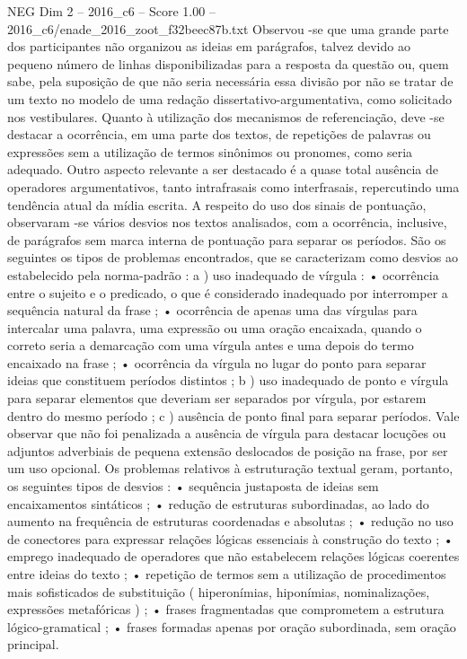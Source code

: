 \begin{textsample}{NEG Dim 2 – 2016\_c6 – Score 1.00 – 2016\_c6/enade\_2016\_zoot\_f32beec87b.txt}
Observou -se que uma grande parte dos participantes não organizou as ideias em parágrafos, talvez devido ao pequeno número de linhas disponibilizadas para a resposta da questão ou, quem sabe, pela suposição de que não seria necessária essa divisão por não se tratar de um texto no modelo de uma redação dissertativo-argumentativa, como solicitado nos vestibulares.
Quanto à utilização dos mecanismos de referenciação, deve -se destacar a ocorrência, em uma parte dos textos, de repetições de palavras ou expressões sem a utilização de termos sinônimos ou pronomes, como seria adequado.
Outro aspecto relevante a ser destacado é a quase total ausência de operadores argumentativos, tanto intrafrasais como interfrasais, repercutindo uma tendência atual da mídia escrita.
A respeito do uso dos sinais de pontuação, observaram -se vários desvios nos textos analisados, com a ocorrência, inclusive, de parágrafos sem marca interna de pontuação para separar os períodos.
São os seguintes os tipos de problemas encontrados, que se caracterizam como desvios ao estabelecido pela norma-padrão : a ) uso inadequado de vírgula : • ocorrência entre o sujeito e o predicado, o que é considerado inadequado por interromper a sequência natural da frase ; • ocorrência de apenas uma das vírgulas para intercalar uma palavra, uma expressão ou uma oração encaixada, quando o correto seria a demarcação com uma vírgula antes e uma depois do termo encaixado na frase ; • ocorrência da vírgula no lugar do ponto para separar ideias que constituem períodos distintos ; b ) uso inadequado de ponto e vírgula para separar elementos que deveriam ser separados por vírgula, por estarem dentro do mesmo período ; c ) ausência de ponto final para separar períodos.
Vale observar que não foi penalizada a ausência de vírgula para destacar locuções ou adjuntos adverbiais de pequena extensão deslocados de posição na frase, por ser um uso opcional.
Os problemas relativos à estruturação textual geram, portanto, os seguintes tipos de desvios : • sequência justaposta de ideias sem encaixamentos sintáticos ; • redução de estruturas subordinadas, ao lado do aumento na frequência de estruturas coordenadas e absolutas ; • redução no uso de conectores para expressar relações lógicas essenciais à construção do texto ; • emprego inadequado de operadores que não estabelecem relações lógicas coerentes entre ideias do texto ; • repetição de termos sem a utilização de procedimentos mais sofisticados de substituição ( hiperonímias, hiponímias, nominalizações, expressões metafóricas ) ; • frases fragmentadas que comprometem a estrutura lógico-gramatical ; • frases formadas apenas por oração subordinada, sem oração principal.

\end{textsample}
